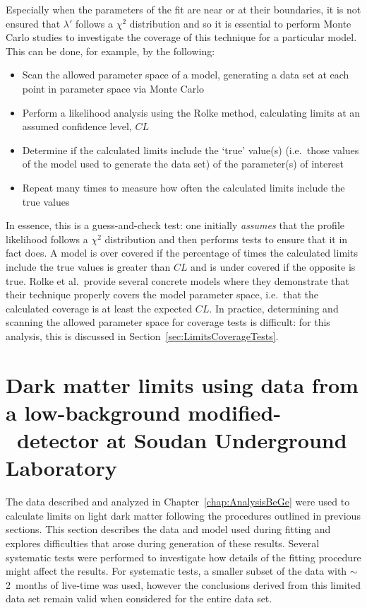  Especially when the parameters of the fit are near or at their boundaries, it is not ensured that $\lambda'$ follows a $\chi^{2}$ distribution and so it is essential to perform Monte Carlo studies to investigate the coverage of this technique for a particular model.  This can be done, for example, by the following:
		\begin{itemize}
			\item Scan the allowed parameter space of a model, 
			generating a data set at each point in parameter space via Monte Carlo
			\item Perform a likelihood analysis using the Rolke method, calculating limits at an 
			assumed confidence level, $CL$
			\item Determine if the calculated limits include the `true' value(s) (i.e.~those values of 
			the model used to generate the data set) of the parameter(s) of interest 
			\item Repeat many times to measure how often the calculated limits include the true values
		\end{itemize}			
In essence, this is a guess-and-check test: one initially \emph{assumes} that the profile likelihood follows a $\chi^{2}$ distribution and then performs tests to ensure that it in fact does.  A model is over covered if the percentage of times the calculated limits include the true values is greater than $CL$ and is under covered if the opposite is true.  Rolke et al.~provide several concrete models where they demonstrate that their technique properly covers the model parameter space, i.e.~that the calculated coverage is at least the expected $CL$.  In practice, determining and scanning the allowed parameter space for coverage tests is difficult: for this analysis, this is discussed in Section~\ref{sec:LimitsCoverageTests}.


\section{Dark matter limits using data from a low-background modified-\bege~detector at Soud\-an Underground Laboratory} 
\label{sec:DMLimitsWithSoudan}

	The data described and analyzed in Chapter~\ref{chap:AnalysisBeGe} were used to calculate limits on light dark matter following the procedures outlined in previous sections.  This section describes the data and model used during fitting and explores difficulties that arose during generation of these results.  Several systematic tests were performed to investigate how details of the fitting procedure might affect the results.  For systematic tests, a smaller subset of the data with $\sim$2~months of live-time was used, however the conclusions derived from this limited data set remain valid when considered for the entire data set.

